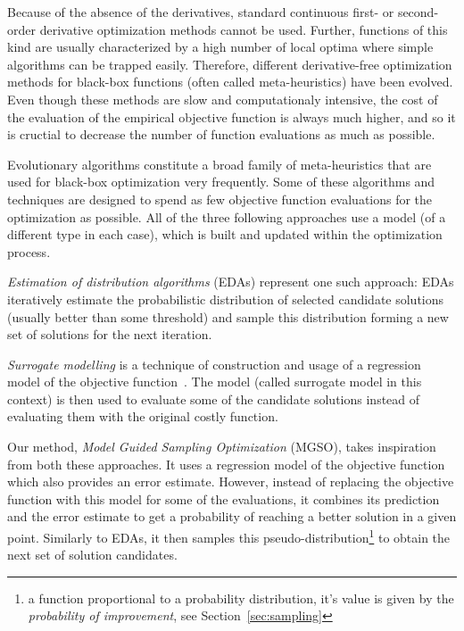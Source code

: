 \documentclass{itatnew}
\begin{document}
Because of the absence of the derivatives, standard continuous first- or second-order derivative optimization methods cannot be used. Further, functions of this kind are usually characterized by a high number of local optima where simple algorithms can be trapped easily. Therefore, different derivative-free optimization methods for black-box functions (often called meta-heuristics) have been evolved. Even though these methods are slow and computationaly intensive, the cost of the evaluation of the empirical objective function is always much higher, and so it is cructial to decrease the number of function evaluations as much as possible.

Evolutionary algorithms constitute a broad family of meta-heuristics that are used for black-box optimization very frequently. Some of these algorithms and techniques are designed to spend as few objective function evaluations for the optimization as possible. All of the three following approaches use a model (of a different type in each case), which is built and updated within the optimization process.

\emph{Estimation of distribution algorithms} (EDAs) \cite{larranaga_estimation_2002} represent one such approach: EDAs iteratively estimate the probabilistic distribution of selected candidate solutions (usually better than some threshold) and sample this distribution forming a new set of solutions for the next iteration. 

\emph{Surrogate modelling} is a technique of construction and usage of a regression model of the objective function~\cite{jin_comprehensive_2005}. The model (called surrogate model in this context) is then used to evaluate some of the candidate solutions instead of evaluating them with the original costly function.

Our method, \emph{Model Guided Sampling Optimization} (MGSO), takes inspiration from both these approaches. It uses a regression model of the objective function which also provides an error estimate. However, instead of replacing the objective function with this model for some of the evaluations, it combines its prediction and the error estimate to get a probability of reaching a better solution in a given point. Similarly to EDAs, it then samples this pseudo-distribution\footnote{a function proportional to a probability distribution, it's value is given by the \emph{probability of improvement}, see Section~\ref{sec:sampling}} to obtain the next set of solution candidates.
\end{document}
